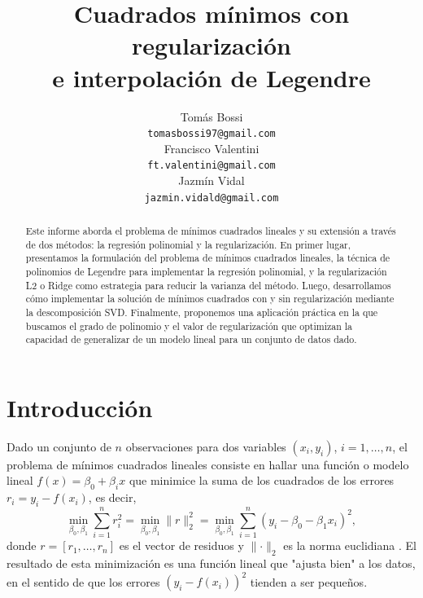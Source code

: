 \documentclass{article}
\title{Cuadrados mínimos con regularización\\e interpolación de Legendre}
\author{%
  Tomás Bossi\\
  \texttt{tomasbossi97@gmail.com} \\
  \And
  Francisco Valentini \\
  \texttt{ft.valentini@gmail.com} \\
  \And
  Jazmín Vidal \\
  \texttt{jazmin.vidald@gmail.com} \\
}
\begin{document}
\maketitle

\begin{abstract}

Este informe aborda el problema de mínimos cuadrados lineales y su extensión a través de dos métodos: la regresión polinomial y la regularización. En primer lugar, presentamos la formulación del problema de mínimos cuadrados lineales, la técnica de polinomios de Legendre para implementar la regresión polinomial, y la regularización L2 o Ridge como estrategia para reducir la varianza del método. Luego, desarrollamos cómo implementar la solución de mínimos cuadrados con y sin regularización mediante la descomposición SVD. Finalmente, proponemos una aplicación práctica en la que buscamos el grado de polinomio y el valor de regularización que optimizan la capacidad de generalizar de un modelo lineal para un conjunto de datos dado.

\end{abstract}


\section{Introducción} \label{sec:intro}


Dado un conjunto de $n$ observaciones para dos variables $(x_i, y_i)$, $i = 1, \ldots, n$, el problema de mínimos cuadrados lineales consiste en hallar una función o modelo lineal $f(x) = \beta_0 + \beta_i x$ que minimice la suma de los cuadrados de los errores $r_i = y_i - f(x_i)$, es decir, 
%
\begin{equation} \nonumber
    \min_{\beta_0, \beta_1} \sum_{i=1}^n r_i^2 = 
    \min_{\beta_0, \beta_1} \lVert r \rVert_2^2 =
    \min_{\beta_0, \beta_1} \sum_{i=1}^n (y_i - \beta_0 - \beta_1 x_i)^2,
\end{equation}
%
donde $r = [r_1, \ldots, r_n]$ es el vector de residuos y $\lVert \cdot \rVert_2$ es la norma euclidiana \citep{watkins2004fundamentals}. El resultado de esta minimización es una función lineal que "ajusta bien" a los datos, en el sentido de que los errores $(y_i - f(x_i))^2$ tienden a ser pequeños.
\end{document}
